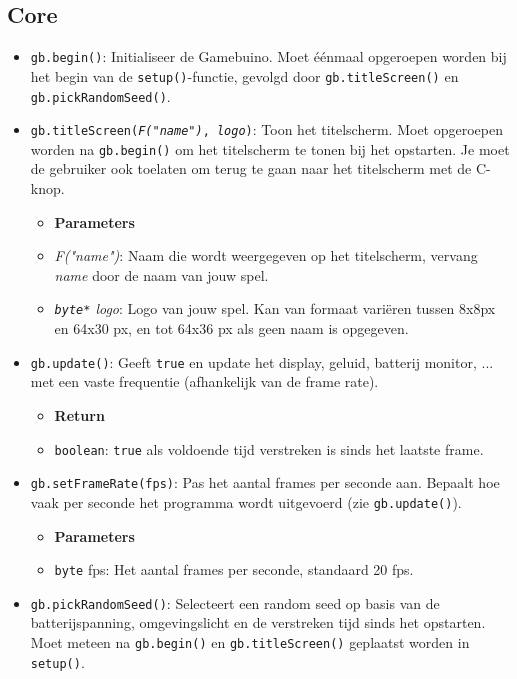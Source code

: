 \documentclass[a4paper,titlepage,12pt]{article}
\begin{document}
	\subsection{Core}
	\begin{itemize}
		\item \texttt{gb.begin()}:
		Initialiseer de Gamebuino. Moet éénmaal opgeroepen worden bij het begin van de \texttt{setup()}-functie, gevolgd door \texttt{gb.titleScreen()} en \texttt{gb.pickRandomSeed()}.
		
		\item \texttt{gb.titleScreen(\textit{F("name")}, \textit{logo})}:
		Toon het titelscherm. Moet opgeroepen worden na \texttt{gb.begin()} om het titelscherm te tonen bij het opstarten. Je moet de gebruiker ook toelaten om terug te gaan naar het titelscherm met de C-knop.
		\begin{itemize}
			\item [] \textbf{Parameters}
			\item \textit{F("name")}: Naam die wordt weergegeven op het titelscherm, vervang \textit{name} door de naam van jouw spel.
			\item \textit{\texttt{byte*} logo}: Logo van jouw spel. Kan van formaat variëren tussen 8x8px en 64x30 px, en tot 64x36 px als geen naam is opgegeven.
		\end{itemize}
	
		\item \samepage \texttt{gb.update()}:
		Geeft \texttt{true} en update het display, geluid, batterij monitor, ... met een vaste frequentie (afhankelijk van de frame rate).
		\begin{itemize}
			\item [] \textbf{Return}
			\item \texttt{boolean}: \texttt{true} als voldoende tijd verstreken is sinds het laatste frame.
		\end{itemize}
	
		\item \texttt{gb.setFrameRate(fps)}:
		Pas het aantal frames per seconde aan. Bepaalt hoe vaak per seconde het programma wordt uitgevoerd (zie \texttt{gb.update()}).
		\begin{itemize}
			\item [] \textbf{Parameters}
			\item \texttt{byte} fps: Het aantal frames per seconde, standaard 20 fps.
		\end{itemize}
	
		\item \texttt{gb.pickRandomSeed()}:
		Selecteert een random seed op basis van de batterijspanning, omgevingslicht en de verstreken tijd sinds het opstarten. Moet meteen na \texttt{gb.begin()} en \texttt{gb.titleScreen()} geplaatst worden in \texttt{setup()}.
		

\end{itemize}
\end{document}
